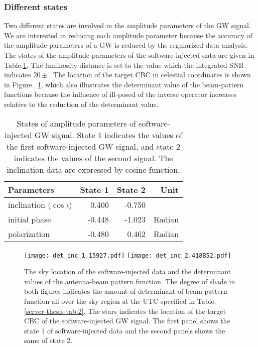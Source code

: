 \documentclass[%
 aps,
 prd,
 amsmath,amssymb,
 reprint,%
superscriptaddress
]{revtex4-1}
\begin{document}
\subsubsection{Different states}\label{ken-short_thesis-sec:different-status}
Two different states are involved in the amplitude parameters of the GW signal. We are interested in reducing each amplitude parameter because the accuracy of the amplitude parameters of a GW is reduced by the regularized data analysis. The states of the amplitude parameters of the software-injected data are given in Table.\ref{ken-short_thesis-tab:3}. The luminosity distance is set to the value which the integrated SNR indicates
$20\pm$. The location of the target CBC in celestial coordinates is shown in Figure.~\ref{ken-short_thesis-fig:1}, which also illustrates the determinant value of the beam-pattern functions because the influence of ill-posed of the inverse operator increases relative to the reduction of the determinant value.
\begin{table}[htb]
  \begin{center}
    \begin{tabular}{|l||r||r|r|} \hline
     Parameters & State 1  & State 2 &Unit \\ \hline \hline
     inclination ($\cos\iota$) & 0.400 & -0.750& \\
     initial phase&-0.448 &-1.023 &Radian \\
     polarization&-0.480 &0.462 &Radian \\\hline
    \end{tabular}
  \end{center}
    \caption{States of amplitude parameters of software-injected GW signal. State 1 indicates the values of the first software-injected GW signal, and state 2 indicates the values of the second signal. The inclination data are expressed by cosine function.\label{ken-short_thesis-tab:3}}
\end{table}

\begin{figure}[tb]
  \centering
   \texttt{[image: det\_inc\_1.15927.pdf]}
   \texttt{[image: det\_inc\_2.418852.pdf]}
   \caption{The sky location of the software-injected data and the determinant values of the antenna-beam pattern function. The degree of shade in both figures indicates the amount of determinant of beam-pattern function all over the sky region at the UTC specified in Table.\ref{server-thesis-tab:2}. The stars indicates the location of the target CBC of the software-injected GW signal. The first panel shows the state 1 of software-injected data and the second panels shows the same of state 2.\label{ken-short_thesis-fig:1}}
\end{figure}
\end{document}
